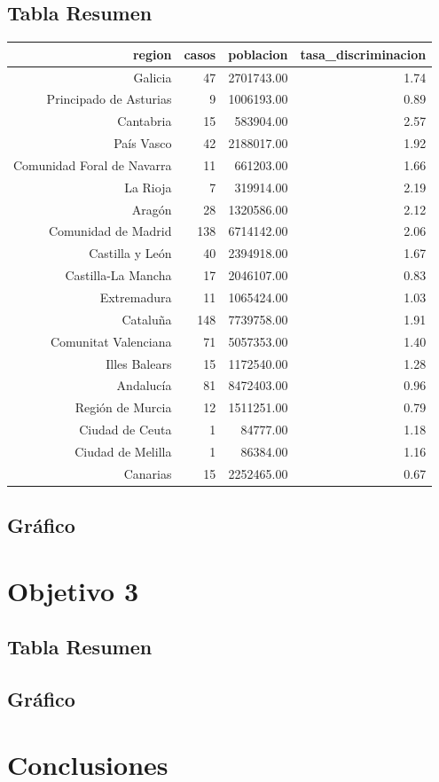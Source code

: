 \documentclass{article}
\begin{document}
\subsection{Tabla Resumen}
\begin{table}[ht]
\centering
\begin{tabular}{rrrr}
  \hline
region & casos & poblacion & tasa\_discriminacion \\ 
  \hline
Galicia &  47 & 2701743.00 & 1.74 \\ 
  Principado de Asturias &   9 & 1006193.00 & 0.89 \\ 
  Cantabria &  15 & 583904.00 & 2.57 \\ 
  País Vasco &  42 & 2188017.00 & 1.92 \\ 
  Comunidad Foral de Navarra &  11 & 661203.00 & 1.66 \\ 
  La Rioja &   7 & 319914.00 & 2.19 \\ 
  Aragón &  28 & 1320586.00 & 2.12 \\ 
  Comunidad de Madrid & 138 & 6714142.00 & 2.06 \\ 
  Castilla y León &  40 & 2394918.00 & 1.67 \\ 
  Castilla-La Mancha &  17 & 2046107.00 & 0.83 \\ 
  Extremadura &  11 & 1065424.00 & 1.03 \\ 
  Cataluña & 148 & 7739758.00 & 1.91 \\ 
  Comunitat Valenciana &  71 & 5057353.00 & 1.40 \\ 
  Illes Balears &  15 & 1172540.00 & 1.28 \\ 
  Andalucía &  81 & 8472403.00 & 0.96 \\ 
  Región de Murcia &  12 & 1511251.00 & 0.79 \\ 
  Ciudad de Ceuta &   1 & 84777.00 & 1.18 \\ 
  Ciudad de Melilla &   1 & 86384.00 & 1.16 \\ 
  Canarias &  15 & 2252465.00 & 0.67 \\ 
   \hline
\end{tabular}
\end{table}

\subsection{Gráfico}


\section*{Objetivo 3}
\subsection{Tabla Resumen}
\subsection{Gráfico}


\section*{Conclusiones}
\end{document}
